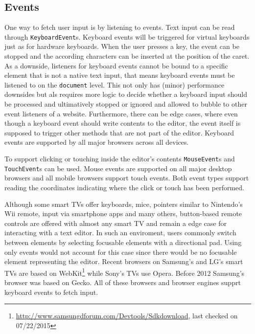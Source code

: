 \subsection{Events} One way to fetch user input is by listening to events. Text input can be read through \texttt{KeyboardEvent}s. Keyboard events will be triggered for virtual keyboards just as for hardware keyboards. When the user presses a key, the event can be stopped and the according characters can be inserted at the position of the caret. As a downside, listeners for keyboard events cannot be bound to a specific element that is not a native text input, that means keyboard events must be listened to on the \texttt{document} level. This not only has (minor) performance downsides but als requires more logic to decide whether a keyboard input should be processed and ultimatively stopped or ignored and allowed to bubble to other event listeners of a website. Furthermore, there can be edge cases, where even though a keyboard event should write contents to the editor, the event itself is supposed to trigger other methods that are not part of the editor. Keyboard events are supported by all major browsers across all devices.

To support clicking or touching inside the editor's contents \texttt{MouseEvent}s and \texttt{TouchEvent}s can be used. Mouse events are supported on all major desktop browsers and all mobile browsers support touch events. Both event types support reading the coordinates indicating where the click or touch has been performed.

Although some smart TVs offer keyboards, mice, pointers similar to Nintendo's Wii remote, input via smartphone apps and many others, button-based remote controls are offered with almost any smart TV and remain a edge case for interacting with a text editor. In such an enviroment, users commonly switch between elements by selecting focusable elements with a directional pad. Using only events would not account for this case since there would be no focusable element representing the editor. Recent browsers on Samsung's and LG's smart TVs are based on WebKit\footnote{\url{http://www.samsungdforum.com/Devtools/Sdkdownload}, last checked on 07/22/2015} while Sony's TVs use Opera. Before 2012 Samsung's browser was based on Gecko. All of these browsers and browser engines supprt keyboard events to fetch input.

